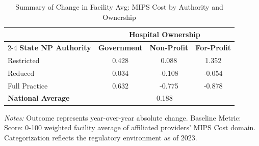 \begin{table}[htbp]
    \centering
    \caption{Summary of Change in Facility Avg: MIPS Cost by Authority and Ownership}
    \label{tab:d_mips_cost_score_own}
    \vspace{0.2cm}
    \begin{tabular}{lccc}
        \toprule
        & \multicolumn{3}{c}{\textbf{Hospital Ownership}} \\
        \cmidrule(lr){2-4}
        \textbf{State NP Authority} & \textbf{Government} & \textbf{Non-Profit} & \textbf{For-Profit} \\
        \midrule
        Restricted & 0.428 & 0.088 & 1.352 \\
        Reduced & 0.034 & -0.108 & -0.054 \\
        Full Practice & 0.632 & -0.775 & -0.878 \\
        \midrule
        \textbf{National Average} & \multicolumn{3}{c}{0.188} \\
        \bottomrule
    \end{tabular}
    \vspace{0.1cm}
    \begin{minipage}{0.85\textwidth}
        \footnotesize \textit{Notes:} Outcome represents year-over-year absolute change. Baseline Metric: Score: 0-100 weighted facility average of affiliated providers' MIPS Cost domain. Categorization reflects the regulatory environment as of 2023.
    \end{minipage}
\end{table}